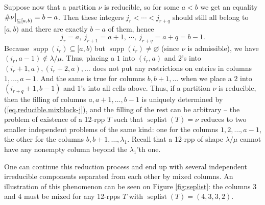 \documentclass[12pt]{article}
\theoremstyle{plain}
\theoremstyle{definition}
\def\seplist{{\operatorname{seplist}}} %
\def\seplistvar{{{\nu}}} %
\def\supp{{\operatorname{supp}}}
\def\lm{{\lambda/\mu}}
\begin{document}
Suppose now that a partition $\seplistvar$ is reducible, so for some $a<b$ we get an equality $\#\nuab=b-a$. Then these integers $j_r<\cdots<j_{r+q}$ should still all belong to $[a,b)$ and there are exactly $b-a$ of them, hence 
\begin{equation}
j_r=a,\ j_{r+1}=a+1,\ \cdots,\ j_{r+q}=a+q=b-1 .
\label{eq.reducible.mixblock-j}
\end{equation}
Because $\supp(i_r)\subseteq[a,b)$ but $\supp(i_r)\neq\varnothing$ (since $\nu$ is admissible), we have $(i_r,a-1)\notin\lm$. Thus, placing a $1$ into $(i_r,a)$ and $2$'s into $(i_r+1,a),(i_r+2,a),\dots$ does not put any restrictions on entries in columns $1,\dots, a-1$. And the same is true for columns $b,b+1,\dots$ when we place a $2$ into $(i_{r+q}+1,b-1)$ and $1$'s into all cells above. Thus, if a partition $\seplistvar$ is reducible, then the filling of columns $a,a+1,\dots, b-1$ is uniquely determined by (\ref{eq.reducible.mixblock-j}), and the filling of the rest can be arbitrary -- the problem of existence of a 12-rpp $T$ such that $\seplist(T)=\seplistvar$ reduces to two smaller independent problems of the same kind: one for the columns $1,2,\ldots,a-1$, the other for the columns $b,b+1,\ldots,\lambda_1$. Recall that a 12-rpp of shape $\lm$ cannot have any nonempty column beyond the $\lambda_1$'th one. 

One can continue this reduction process and end up with several independent irreducible components separated from each other by mixed columns. An illustration of this phenomenon can be seen on Figure \ref{fig:seplist}: the columns $3$ and $4$ must be mixed for any 12-rpps $T$ with $\seplist(T)=(4,3,3,2)$.
\end{document}
